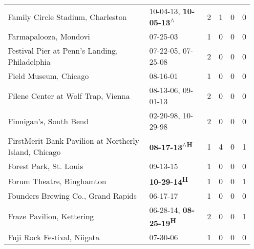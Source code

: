 \begin{supertabular}{p{0.4\textwidth}p{0.3\textwidth}p{0.05\textwidth}p{0.05\textwidth}p{0.05\textwidth}p{0.05\textwidth}}
                                            Family Circle Stadium, Charleston &                     10-04-13\textsuperscript{}, \textbf{10-05-13\textsuperscript{$\wedge$}} &  2 &  1 &  0 &  0 \\
                                                        Farmapalooza, Mondovi &                                                                  07-25-03\textsuperscript{} &  1 &  0 &  0 &  0 \\
                                Festival Pier at Penn's Landing, Philadelphia &                                      07-22-05\textsuperscript{}, 07-25-08\textsuperscript{} &  2 &  0 &  0 &  0 \\
                                                        Field Museum, Chicago &                                                                  08-16-01\textsuperscript{} &  1 &  0 &  0 &  0 \\
                                           Filene Center at Wolf Trap, Vienna &                                      08-13-06\textsuperscript{}, 09-01-13\textsuperscript{} &  2 &  0 &  0 &  0 \\
                                                       Finnigan's, South Bend &                                      02-20-98\textsuperscript{}, 10-29-98\textsuperscript{} &  2 &  0 &  0 &  0 \\
                        FirstMerit Bank Pavilion at Northerly Island, Chicago &                                                \textbf{08-17-13\textsuperscript{$\wedge$H}} &  1 &  4 &  0 &  1 \\
                                                       Forest Park, St. Louis &                                                                  09-13-15\textsuperscript{} &  1 &  0 &  0 &  0 \\
                                                    Forum Theatre, Binghamton &                                                        \textbf{10-29-14\textsuperscript{H}} &  1 &  0 &  0 &  1 \\
                                           Founders Brewing Co., Grand Rapids &                                                                  06-17-17\textsuperscript{} &  1 &  0 &  0 &  0 \\
                                                    Fraze Pavilion, Kettering &                            06-28-14\textsuperscript{}, \textbf{08-25-19\textsuperscript{H}} &  2 &  0 &  0 &  1 \\
                                                  Fuji Rock Festival, Niigata &                                                                  07-30-06\textsuperscript{} &  1 &  0 &  0 &  0 \\

\end{supertabular}
